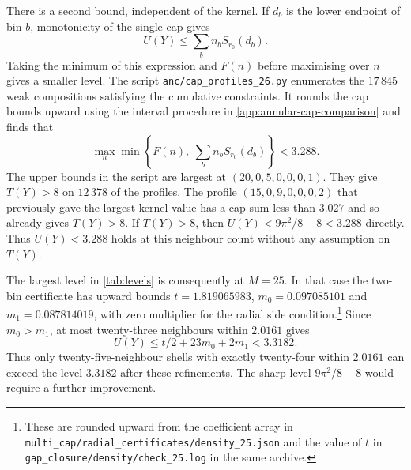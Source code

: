 There is a second bound, independent of the kernel.
If \(d_b\) is the lower endpoint of bin \(b\), monotonicity
of the single cap gives
\[
 U(Y)\le \sum_b n_b S_{r_0}(d_b).
\]
Taking the minimum of this expression and \(F(n)\) before
maximising over \(n\) gives a smaller level. The script
\texttt{anc/cap\_profiles\_26.py} enumerates the \(17\,845\)
weak compositions satisfying the cumulative constraints.
It rounds the cap bounds upward using the interval procedure
in \cref{app:annular-cap-comparison} and finds that
\[
 \max_n\min\left\{F(n),\ \sum_b n_b S_{r_0}(d_b)\right\}
 <3.288 .
\]
The upper bounds in the script are largest at
\((20,0,5,0,0,0,1)\). They give \(T(Y)>8\) on \(12\,378\)
of the profiles. The profile \((15,0,9,0,0,0,2)\) that
previously gave the largest kernel value has a cap sum less
than \(3.027\) and so already gives \(T(Y)>8\).
If \(T(Y)>8\), then \(U(Y)<9\pi^2/8-8<3.288\) directly.
Thus \(U(Y)<3.288\) holds at this neighbour count without
any assumption on \(T(Y)\).

The largest level in \cref{tab:levels} is consequently
at \(M=25\). In that case the two-bin certificate has
upward bounds \(t=1.819065983\), \(m_0=0.097085101\)
and \(m_1=0.087814019\), with zero multiplier
for the radial side condition.\footnote{These are
rounded upward from the coefficient array in
\texttt{multi\_cap/radial\_certificates/density\_25.json}
and the value of \(t\) in \texttt{gap\_closure/density/check\_25.log}
in the same archive.}
Since \(m_0>m_1\), at most twenty-three neighbours
within \(2.0161\) gives
\[
 U(Y)\le t/2+23m_0+2m_1<3.3182.
\]
Thus only twenty-five-neighbour shells with exactly
twenty-four within \(2.0161\) can exceed the level \(3.3182\)
after these refinements. The sharp level \(9\pi^2/8-8\)
would require a further improvement.
